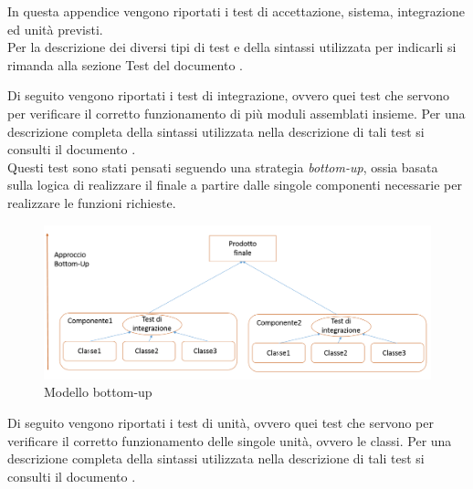 	In questa appendice vengono riportati i test di accettazione, sistema, integrazione ed unità previsti.\\
	Per la descrizione dei diversi tipi di test e della sintassi utilizzata per indicarli si rimanda alla sezione Test del documento .
	
	
		Di seguito vengono riportati i test di integrazione, ovvero quei test che servono per verificare il corretto funzionamento di più moduli assemblati insieme. Per una descrizione completa della sintassi utilizzata nella descrizione di tali test si consulti il documento . \\
		Questi test sono stati pensati seguendo una strategia \textit{bottom-up}, ossia basata sulla logica di realizzare il  finale a partire dalle singole componenti necessarie per realizzare le funzioni richieste.
		\begin{figure}[H]
			\centering
			\includegraphics[scale=0.4]{PianoDiQualifica/Pics/bottom-up.png}
			\caption{Modello bottom-up}
		\end{figure}
			
			
		Di seguito vengono riportati i test di unità, ovvero quei test che servono per verificare il corretto funzionamento delle singole unità, ovvero le classi. Per una descrizione completa della sintassi utilizzata nella descrizione di tali test si consulti il documento .
			
			
